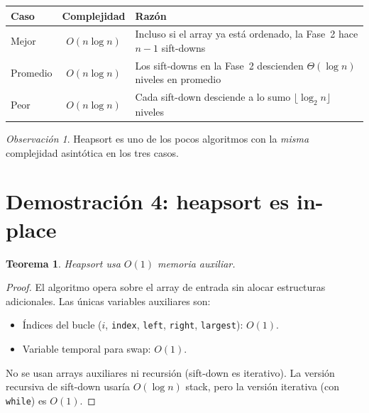 \documentclass[11pt, letterpaper]{article}
\theoremstyle{definition}
\theoremstyle{plain}
\newtheorem{theorem}{Teorema}[section]
\theoremstyle{remark}
\newtheorem{remark}{Observación}[section]
\begin{document}
\begin{table}[h]
\centering
\begin{tabular}{lcp{6cm}}
\toprule
\textbf{Caso} & \textbf{Complejidad} & \textbf{Razón} \\
\midrule
Mejor    & $O(n \log n)$
  & Incluso si el array ya está ordenado, la Fase~2 hace $n{-}1$
    sift-downs \\
Promedio & $O(n \log n)$
  & Los sift-downs en la Fase~2 descienden $\Theta(\log n)$ niveles
    en promedio \\
Peor     & $O(n \log n)$
  & Cada sift-down desciende a lo sumo
    $\lfloor \log_2 n \rfloor$ niveles \\
\bottomrule
\end{tabular}
\end{table}

\begin{remark}
Heapsort es uno de los pocos algoritmos con la \emph{misma}
complejidad asintótica en los tres casos.
\end{remark}

\section{Demostración 4: heapsort es in-place}

\begin{theorem}\label{thm:inplace}
Heapsort usa $O(1)$ memoria auxiliar.
\end{theorem}

\begin{proof}
El algoritmo opera sobre el array de entrada sin alocar estructuras
adicionales. Las únicas variables auxiliares son:
\begin{itemize}
  \item Índices del bucle ($i$, \texttt{index}, \texttt{left},
    \texttt{right}, \texttt{largest}): $O(1)$.
  \item Variable temporal para swap: $O(1)$.
\end{itemize}

No se usan arrays auxiliares ni recursión (sift-down es iterativo). La
versión recursiva de sift-down usaría $O(\log n)$ stack, pero la
versión iterativa (con \texttt{while}) es $O(1)$.
\end{proof}

\end{document}
